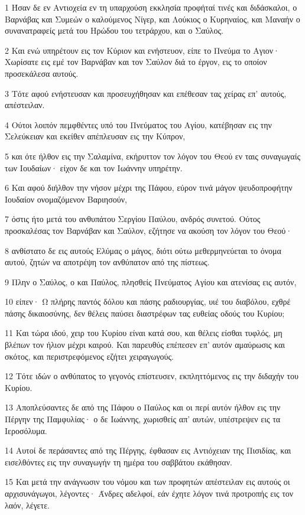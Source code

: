 \par 1 Ήσαν δε εν Αντιοχεία εν τη υπαρχούση εκκλησία προφήταί τινές και διδάσκαλοι, ο Βαρνάβας και Συμεών ο καλούμενος Νίγερ, και Λούκιος ο Κυρηναίος, και Μαναήν ο συνανατραφείς μετά του Ηρώδου του τετράρχου, και ο Σαύλος.
\par 2 Και ενώ υπηρέτουν εις τον Κύριον και ενήστευον, είπε το Πνεύμα το Αγιον· Χωρίσατε εις εμέ τον Βαρνάβαν και τον Σαύλον διά το έργον, εις το οποίον προσεκάλεσα αυτούς.
\par 3 Τότε αφού ενήστευσαν και προσευχήθησαν και επέθεσαν τας χείρας επ' αυτούς, απέστειλαν.
\par 4 Ούτοι λοιπόν πεμφθέντες υπό του Πνεύματος του Αγίου, κατέβησαν εις την Σελεύκειαν και εκείθεν απέπλευσαν εις την Κύπρον,
\par 5 και ότε ήλθον εις την Σαλαμίνα, εκήρυττον τον λόγον του Θεού εν ταις συναγωγαίς των Ιουδαίων· είχον δε και τον Ιωάννην υπηρέτην.
\par 6 Και αφού διήλθον την νήσον μέχρι της Πάφου, εύρον τινά μάγον ψευδοπροφήτην Ιουδαίον ονομαζόμενον Βαριησούν,
\par 7 όστις ήτο μετά του ανθυπάτου Σεργίου Παύλου, ανδρός συνετού. Ούτος προσκαλέσας τον Βαρνάβαν και Σαύλον, εζήτησε να ακούση τον λόγον του Θεού·
\par 8 ανθίστατο δε εις αυτούς Ελύμας ο μάγος, διότι ούτω μεθερμηνεύεται το όνομα αυτού, ζητών να αποτρέψη τον ανθύπατον από της πίστεως.
\par 9 Πλην ο Σαύλος, ο και Παύλος, πλησθείς Πνεύματος Αγίου και ατενίσας εις αυτόν,
\par 10 είπεν· Ω πλήρης παντός δόλου και πάσης ραδιουργίας, υιέ του διαβόλου, εχθρέ πάσης δικαιοσύνης, δεν θέλεις παύσει διαστρέφων τας ευθείας οδούς του Κυρίου;
\par 11 Και τώρα ιδού, χειρ του Κυρίου είναι κατά σου, και θέλεις είσθαι τυφλός, μη βλέπων τον ήλιον μέχρι καιρού. Και παρευθύς επέπεσεν επ' αυτόν αμαύρωσις και σκότος, και περιστρεφόμενος εζήτει χειραγωγούς.
\par 12 Τότε ιδών ο ανθύπατος το γεγονός επίστευσεν, εκπληττόμενος εις την διδαχήν του Κυρίου.
\par 13 Αποπλεύσαντες δε από της Πάφου ο Παύλος και οι περί αυτόν ήλθον εις την Πέργην της Παμφυλίας· ο δε Ιωάννης, χωρισθείς απ' αυτών, υπέστρεψεν εις τα Ιεροσόλυμα.
\par 14 Αυτοί δε περάσαντες από της Πέργης, έφθασαν εις Αντιόχειαν της Πισιδίας, και εισελθόντες εις την συναγωγήν τη ημέρα του σαββάτου εκάθησαν.
\par 15 Και μετά την ανάγνωσιν του νόμου και των προφητών απέστειλαν εις αυτούς οι αρχισυνάγωγοι, λέγοντες· Άνδρες αδελφοί, εάν έχητε λόγον τινά προτροπής εις τον λαόν, λέγετε.
